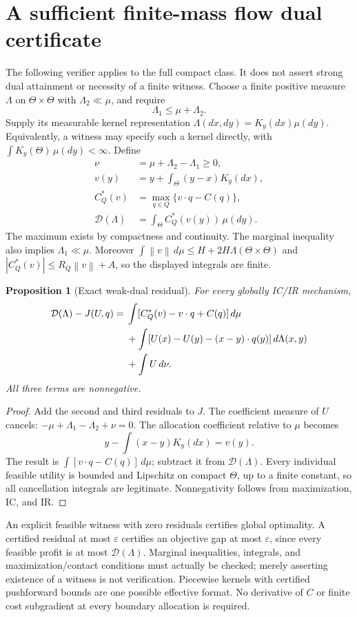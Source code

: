 \documentclass[11pt,a4paper]{article}
\numberwithin{equation}{section}
\newtheorem{proposition}[theorem]{Proposition}
\newcommand{\norm}[1]{\left\lVert #1\right\rVert}
\begin{document}
\section{A sufficient finite-mass flow dual certificate}\label{sec:dual}
The following verifier applies to the full compact class.
It does not assert strong dual attainment or necessity of a finite witness.
Choose a finite positive measure \(\Lambda\) on \(\Theta\times\Theta\)
with \(\Lambda_2\ll\mu\), and require
\[
 \Lambda_1\le\mu+\Lambda_2.
\]
Supply its measurable kernel representation
\(\Lambda(dx,dy)=K_y(dx)\mu(dy)\).
Equivalently, a witness may specify such a kernel directly, with
\(\int K_y(\Theta)\,\mu(dy)<\infty\).
Define
\begin{align*}
 \nu&=\mu+\Lambda_2-\Lambda_1\ge0,\\
 v(y)&=y+\int_\Theta(y-x)K_y(dx),\\
 C_Q^*(v)&=\max_{q\in Q}\{v\cdot q-C(q)\},\\
 \mathcal D(\Lambda)&=\int_\Theta C_Q^*(v(y))\,\mu(dy).
\end{align*}
The maximum exists by compactness and continuity.
The marginal inequality also implies \(\Lambda_1\ll\mu\).
Moreover
\(\int\norm v\,d\mu\le H+2H\Lambda(\Theta\times\Theta)\) and
\(|C_Q^*(v)|\le R_Q\norm v+A\), so the displayed integrals are finite.

\begin{proposition}[Exact weak-dual residual]\label{prop:dual}
For every globally IC/IR mechanism,
\begin{align}
 \mathcal D(\Lambda)-J(U,q)
 ={}&\int[C_Q^*(v)-v\cdot q+C(q)]\,d\mu\notag\\
 &+\int[U(x)-U(y)-(x-y)\cdot q(y)]\,d\Lambda(x,y)\notag\\
 &+\int U\,d\nu.\label{eq:dualresidual}
\end{align}
All three terms are nonnegative.
\end{proposition}
\begin{proof}
Add the second and third residuals to \(J\).
The coefficient measure of \(U\) cancels:
\(-\mu+\Lambda_1-\Lambda_2+\nu=0\).
The allocation coefficient relative to \(\mu\) becomes
\[
 y-\int(x-y)K_y(dx)=v(y).
\]
The result is \(\int[v\cdot q-C(q)]\,d\mu\); subtract it from
\(\mathcal D(\Lambda)\).
Every individual feasible utility is bounded and Lipschitz on compact
\(\Theta\), up to a finite constant, so all cancellation integrals are
legitimate. Nonnegativity follows from maximization, IC, and IR.
\end{proof}
An explicit feasible witness with zero residuals certifies global
optimality. A certified residual at most \(\varepsilon\) certifies an
objective gap at most \(\varepsilon\), since every feasible profit is
at most \(\mathcal D(\Lambda)\).
Marginal inequalities, integrals, and maximization/contact conditions
must actually be checked; merely asserting existence of a witness is
not verification. Piecewise kernels with certified pushforward bounds
are one possible effective format.
No derivative of \(C\) or finite cost subgradient at every boundary
allocation is required.
\end{document}
